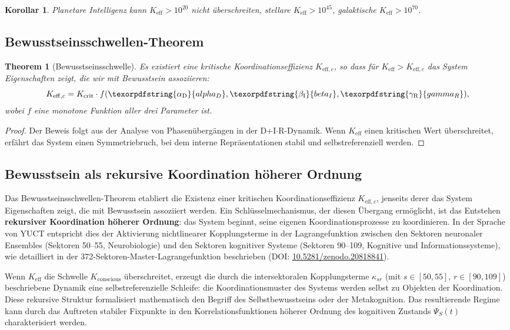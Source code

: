 \documentclass[12pt,a4paper]{article}
\newtheorem{theorem}{Theorem}
\newtheorem{corollary}{Korollar}
\DeclareRobustCommand{\alD}{\texorpdfstring{\ensuremath{\alpha_{\mathrm{D}}}}{alpha_D}}
\DeclareRobustCommand{\beI}{\texorpdfstring{\ensuremath{\beta_{\mathrm{I}}}}{beta_I}}
\DeclareRobustCommand{\gaR}{\texorpdfstring{\ensuremath{\gamma_{\mathrm{R}}}}{gamma_R}}
\newcommand{\eff}{\mathrm{eff}}
\newcommand{\Ke}{K_{\eff}}
\newcommand{\Kec}{K_{\eff,c}}
\newcommand{\Kcrit}{K_{\mathrm{crit}}}
\begin{document}
	\begin{corollary}
		Planetare Intelligenz kann \(\Ke > 10^{20}\) nicht überschreiten, stellare \(\Ke > 10^{45}\), galaktische \(\Ke > 10^{70}\).
	\end{corollary}
	
	\subsection{Bewusstseinsschwellen-Theorem}
	
	\begin{theorem}[Bewusstseinsschwelle]
		Es existiert eine kritische Koordinationseffizienz \(K_{\eff,c}\), so dass für \(\Ke > K_{\eff,c}\) das System Eigenschaften zeigt, die wir mit Bewusstsein assoziieren:
		\[
		\Kec = \Kcrit \cdot f(\alD, \beI, \gaR),
		\]
		wobei \(f\) eine monotone Funktion aller drei Parameter ist.
	\end{theorem}
	
	\begin{proof}
		Der Beweis folgt aus der Analyse von Phasenübergängen in der D+I\(\cdot\)R-Dynamik. Wenn \(\Ke\) einen kritischen Wert überschreitet, erfährt das System einen Symmetriebruch, bei dem interne Repräsentationen stabil und selbstreferenziell werden.
	\end{proof}
	
	\subsection{Bewusstsein als rekursive Koordination höherer Ordnung}
	\label{subsec:recursive-coordination}
	
	Das Bewusstseinsschwellen-Theorem etabliert die Existenz einer kritischen Koordinationseffizienz \(K_{\eff,c}\), jenseits derer das System Eigenschaften zeigt, die mit Bewusstsein assoziiert werden. Ein Schlüsselmechanismus, der diesen Übergang ermöglicht, ist das Entstehen \textbf{rekursiver Koordination höherer Ordnung}: das System beginnt, seine eigenen Koordinationsprozesse zu koordinieren. In der Sprache von YUCT entspricht dies der Aktivierung nichtlinearer Kopplungsterme in der Lagrangefunktion zwischen den Sektoren neuronaler Ensembles (Sektoren 50--55, Neurobiologie) und den Sektoren kognitiver Systeme (Sektoren 90--109, Kognitive und Informationssysteme), wie detailliert in der 372-Sektoren-Master-Lagrangefunktion beschrieben (DOI: \href{https://doi.org/10.5281/zenodo.20818841}{10.5281/zenodo.20818841}).
	
	Wenn \(K_{\eff}\) die Schwelle \(K_{\mathrm{conscious}}\) überschreitet, erzeugt die durch die intersektoralen Kopplungsterme \(\kappa_{sr}\) (mit \(s\in[50,55]\), \(r\in[90,109]\)) beschriebene Dynamik eine selbstreferenzielle Schleife: die Koordinationsmuster des Systems werden selbst zu Objekten der Koordination. Diese rekursive Struktur formalisiert mathematisch den Begriff des Selbstbewusstseins oder der Metakognition. Das resultierende Regime kann durch das Auftreten stabiler Fixpunkte in den Korrelationsfunktionen höherer Ordnung des kognitiven Zustands \(\Psi_S(t)\) charakterisiert werden.
	
\end{document}

